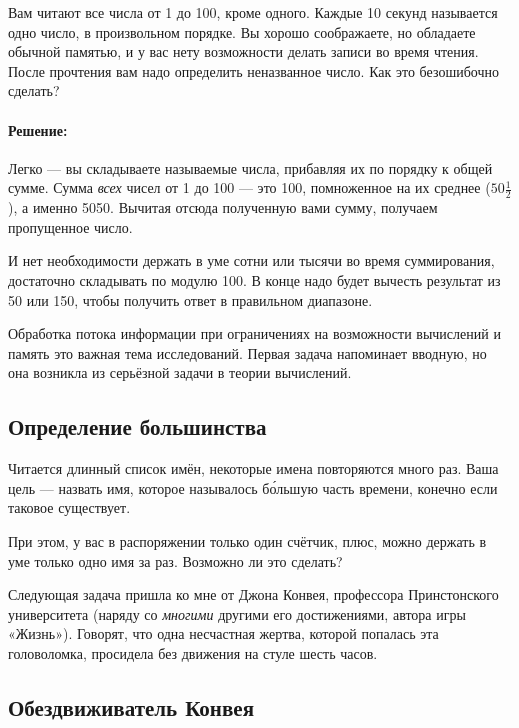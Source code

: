 Вам читают все числа от 1 до 100, кроме одного.
Каждые 10 секунд называется одно число, в произвольном порядке.
Вы хорошо соображаете, но обладаете обычной памятью, и у вас нету возможности делать записи во время чтения.
После прочтения вам надо определить неназванное число.
Как это безошибочно сделать?

\paragraph{Решение:} Легко --- вы складываете называемые числа, прибавляя их по порядку к общей сумме.
Сумма \emph{всех} чисел от 1 до 100 --- это 100, помноженное на их среднее ($50\tfrac12$), а именно 5050.
Вычитая отсюда полученную вами сумму, получаем пропущенное число.

И нет необходимости держать в уме сотни или тысячи во время суммирования, достаточно складывать по модулю 100.
В конце надо будет вычесть результат из 50 или 150, чтобы получить ответ в правильном диапазоне.
\heart

Обработка потока информации при ограничениях на возможности вычислений и память это важная тема исследований.
Первая задача напоминает вводную, но она возникла из серьёзной задачи в теории вычислений.

\subsection*{Определение большинства}%

Читается длинный список имён, некоторые имена повторяются много раз.
Ваша цель --- назвать имя, которое называлось б\'{о}льшую часть времени,
конечно если таковое существует.

\medskip

При этом, у вас в распоряжении только один счётчик, плюс, можно держать в уме только одно имя за раз.
Возможно ли это сделать?

\medskip

Следующая задача пришла ко мне от Джона Конвея, профессора Принстонского университета (наряду со \emph{многими} другими его достижениями, автора игры «Жизнь»).
Говорят, что одна несчастная жертва, которой попалась эта головоломка, просидела без движения на стуле шесть часов.

\subsection*{Обездвиживатель Конвея}%

